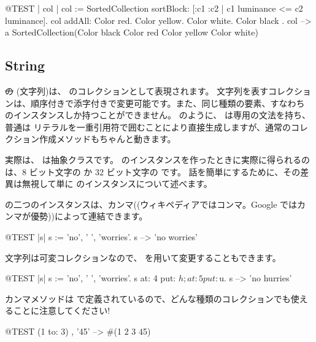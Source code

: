 \documentclass[a4paper,10pt,twoside]{book}
\begin{document}
\begin{code}{@TEST | col |}
col := SortedCollection sortBlock: [:c1 :c2 | c1 luminance <= c2 luminance].
col addAll: { Color red. Color yellow. Color white. Color black }.
col --> a SortedCollection(Color black Color red Color yellow Color white)
\end{code}

\subsection{String}
\st の  (文字列)は、 のコレクションとして表現されます。
文字列を表すコレクションは、順序付きで添字付きで変更可能です。また、同じ種類の要素、すなわち  のインスタンスしか持つことができません。
 のように、 は専用の文法を持ち、普通は  リテラルを一重引用符で囲むことにより直接生成しますが、通常のコレクション作成メソッドもちゃんと動きます。


実際は、 は抽象クラスです。
 のインスタンスを作ったときに実際に得られるのは、8 ビット文字の  か 32 ビット文字の  です。
話を簡単にするために、その差異は無視して単に  のインスタンスについて述べます。

 の二つのインスタンスは、カンマ((ウィキペディアではコンマ。Google ではカンマが優勢))によって連結できます。
\begin{code}{@TEST |s|}
s := 'no', ' ', 'worries'.
s -->  'no worries'
\end{code}

文字列は可変コレクションなので、 を用いて変更することもできます。

\begin{code}{@TEST |s| s := 'no', ' ', 'worries'.}
s at: 4 put: $h; at: 5 put: $u.
s --> 'no hurries'
\end{code}

カンマメソッドは  で定義されているので、どんな種類のコレクションでも使えることに注意してください!
\begin{code}{@TEST}
(1 to: 3) , '45' --> #(1 2 3 $4 $5)
\end{code}
\end{document}
